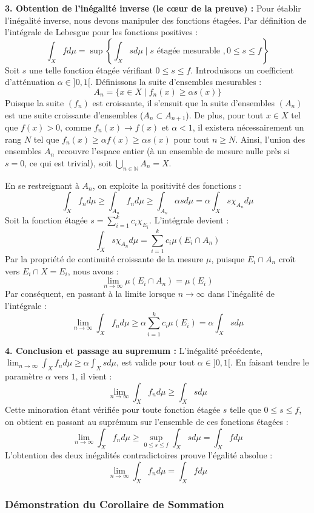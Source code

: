 \documentclass[11pt,a4paper]{article}
\begin{document}
\textbf{3. Obtention de l'inégalité inverse (le cœur de la preuve) :}
Pour établir l'inégalité inverse, nous devons manipuler des fonctions étagées. Par définition de l'intégrale de Lebesgue pour les fonctions positives :
$$\int_X f d\mu = \sup \left\{ \int_X s d\mu \mid s \text{ étagée mesurable }, 0 \le s \le f \right\}$$
Soit $s$ une telle fonction étagée vérifiant $0 \le s \le f$.
Introduisons un coefficient d'atténuation $\alpha \in ]0, 1[$.
Définissons la suite d'ensembles mesurables :
$$A_n = \{x \in X \mid f_n(x) \ge \alpha s(x) \}$$
Puisque la suite $(f_n)$ est croissante, il s'ensuit que la suite d'ensembles $(A_n)$ est une suite croissante d'ensembles ($A_n \subset A_{n+1}$).
De plus, pour tout $x \in X$ tel que $f(x) > 0$, comme $f_n(x) \to f(x)$ et $\alpha < 1$, il existera nécessairement un rang $N$ tel que $f_n(x) \ge \alpha f(x) \ge \alpha s(x)$ pour tout $n \ge N$. Ainsi, l'union des ensembles $A_n$ recouvre l'espace entier (à un ensemble de mesure nulle près si $s=0$, ce qui est trivial), soit $\bigcup_{n \in \mathbb{N}} A_n = X$.

En se restreignant à $A_n$, on exploite la positivité des fonctions :
$$\int_X f_n d\mu \ge \int_{A_n} f_n d\mu \ge \int_{A_n} \alpha s d\mu = \alpha \int_X s \chi_{A_n} d\mu$$
Soit la fonction étagée $s = \sum_{i=1}^k c_i \chi_{E_i}$.
L'intégrale devient :
$$\int_X s \chi_{A_n} d\mu = \sum_{i=1}^k c_i \mu(E_i \cap A_n)$$
Par la propriété de continuité croissante de la mesure $\mu$, puisque $E_i \cap A_n$ croît vers $E_i \cap X = E_i$, nous avons :
$$\lim_{n \to \infty} \mu(E_i \cap A_n) = \mu(E_i)$$
Par conséquent, en passant à la limite lorsque $n \to \infty$ dans l'inégalité de l'intégrale :
$$\lim_{n \to \infty} \int_X f_n d\mu \ge \alpha \sum_{i=1}^k c_i \mu(E_i) = \alpha \int_X s d\mu$$

\textbf{4. Conclusion et passage au supremum :}
L'inégalité précédente, $\lim_{n \to \infty} \int_X f_n d\mu \ge \alpha \int_X s d\mu$, est valide pour tout $\alpha \in ]0, 1[$.
En faisant tendre le paramètre $\alpha$ vers $1$, il vient :
$$\lim_{n \to \infty} \int_X f_n d\mu \ge \int_X s d\mu$$
Cette minoration étant vérifiée pour toute fonction étagée $s$ telle que $0 \le s \le f$, on obtient en passant au suprémum sur l'ensemble de ces fonctions étagées :
$$\lim_{n \to \infty} \int_X f_n d\mu \ge \sup_{0 \le s \le f} \int_X s d\mu = \int_X f d\mu$$
L'obtention des deux inégalités contradictoires prouve l'égalité absolue :
$$\lim_{n \to \infty} \int_X f_n d\mu = \int_X f d\mu$$

\subsubsection*{Démonstration du Corollaire de Sommation}
\end{document}
